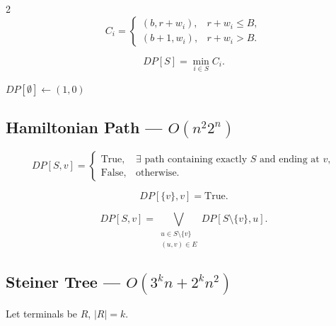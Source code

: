\documentclass[8pt]{extarticle}
\theoremstyle{definition}
\begin{document}
\begin{multicols*}{2}
\[
C_i=
\begin{cases}
(b,r+w_i),&r+w_i\le B,\\
(b+1,w_i),&r+w_i>B.
\end{cases}
\]

\[
DP[S]=\min_{i\in S} C_i.
\]

\begin{algorithm}[H]
\DontPrintSemicolon
$DP[\emptyset]\gets(1,0)$\;
\;
\end{algorithm}


\subsection{Hamiltonian Path --- $O(n^2 2^n)$}

\[
DP[S,v]=
\begin{cases}
\mathrm{True},&
\exists\text{ path containing exactly }S
\text{ and ending at }v,\\
\mathrm{False},&\text{otherwise}.
\end{cases}
\]

\[
DP[\{v\},v]=\mathrm{True}.
\]

\[
DP[S,v]
=
\bigvee_{\substack{u\in S\setminus\{v\}\\(u,v)\in E}}
DP[S\setminus\{v\},u].
\]

\begin{algorithm}[H]
\DontPrintSemicolon
{}
\;
\end{algorithm}


\subsection{Steiner Tree --- $O(3^k n + 2^k n^2)$}

Let terminals be $R$, $|R|=k$.


\end{multicols*}
\end{document}
